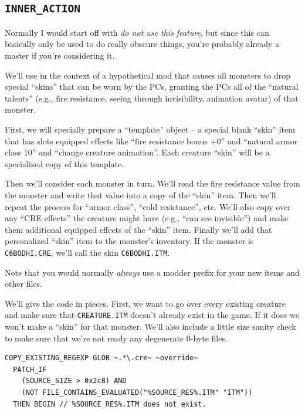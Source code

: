 \documentclass{article}
\def\ttref#1{\ahrefloc{#1}{\tt #1}}
\def\t#1{{\tt #1}}
\begin{document}
\label{sec-inner-action}\subsection{\t{INNER_ACTION}}

Normally I would start off with \emph{do not use this feature}, but since
this \ttref{patch} can basically only be used to do really obscure things,
you're probably already a master if you're considering it.

We'll use \ttref{INNER_ACTION} in the context of a hypothetical mod
that causes all monsters to drop special ``skins'' that can be worn by the
PCs, granting the PCs all of the ``natural talents'' (e.g., fire
resistance, seeing through invisibility, animation avatar) of that monster.

First, we will specially prepare a ``template'' object -- a special blank
``skin'' item that has slots equipped effects like ``fire resistance bonus
+0'' and ``natural armor class 10'' and ``change creature animation''. Each
creature ``skin'' will be a specialized copy of this template.

Then we'll consider each monster in turn. We'll read the fire resistance
value from the monster and write that value into a copy of the ``skin''
item. Then we'll repeat the process for ``armor class'', ``cold
resistance'', etc.  We'll also copy over any ``CRE effects'' the creature
might have (e.g., ``can see invisible'') and make them additional equipped
effects of the ``skin'' item. Finally we'll add that personalized ``skin''
item to the monster's inventory. If the monster is \t{C6BODHI.CRE}, we'll
call the skin \t{C6BODHI.ITM}.

Note that you would normally \emph{always} use a modder prefix for your new
items and other files.

We'll give the code in pieces. First, we want to go over every existing
creature and make sure that \t{CREATURE.ITM} doesn't already exist in the
game. If it does we won't make a ``skin'' for that monster. We'll also
include a little size sanity check to make sure that we're not ready any
degenerate 0-byte files.

\begin{verbatim}
COPY_EXISTING_REGEXP GLOB ~.*\.cre~ ~override~
  PATCH_IF
    (SOURCE_SIZE > 0x2c8) AND
    (NOT FILE_CONTAINS_EVALUATED("%SOURCE_RES%.ITM" "ITM"))
  THEN BEGIN // %SOURCE_RES%.ITM does not exist.
\end{verbatim}
\end{document}
